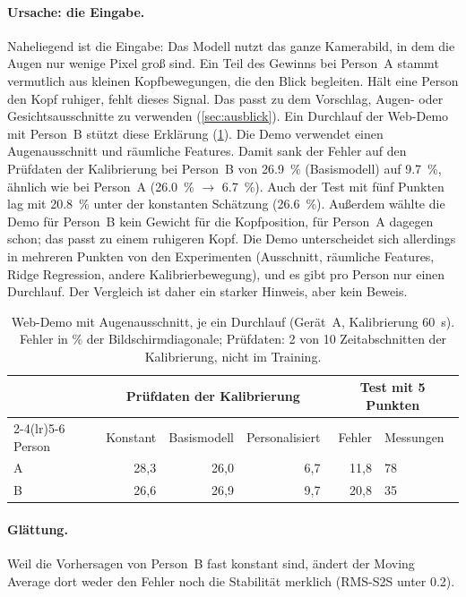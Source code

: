\paragraph{Ursache: die Eingabe.} Naheliegend ist die Eingabe: Das Modell nutzt
das ganze Kamerabild, in dem die Augen nur wenige Pixel groß sind. Ein Teil des
Gewinns bei Person~A stammt vermutlich aus kleinen Kopfbewegungen, die den Blick
begleiten. Hält eine Person den Kopf ruhiger, fehlt dieses Signal. Das passt zu
dem Vorschlag, Augen- oder Gesichtsausschnitte zu verwenden
(\cref{sec:ausblick}). Ein Durchlauf der Web-Demo mit Person~B stützt diese
Erklärung (\cref{tab:demo_persons}). Die Demo verwendet einen Augenausschnitt
und räumliche Features. Damit sank der Fehler auf den Prüfdaten der
Kalibrierung bei Person~B von \SI{26,9}{\percent} (Basismodell) auf
\SI{9,7}{\percent}, ähnlich wie bei Person~A (\SI{26,0}{\percent}
$\rightarrow$ \SI{6,7}{\percent}). Auch der Test mit fünf Punkten lag mit
\SI{20,8}{\percent} unter der konstanten Schätzung (\SI{26,6}{\percent}).
Außerdem wählte die Demo für Person~B kein Gewicht für die Kopfposition, für
Person~A dagegen schon; das passt zu einem ruhigeren Kopf. Die Demo unterscheidet
sich allerdings in mehreren Punkten von den Experimenten (Ausschnitt,
räumliche Features, Ridge Regression, andere Kalibrierbewegung), und es gibt
pro Person nur einen Durchlauf. Der Vergleich ist daher ein starker Hinweis,
aber kein Beweis.

\begin{table}[htbp]
  \centering
  \caption[Web-Demo mit beiden Personen]{Web-Demo mit Augenausschnitt, je ein Durchlauf (Gerät~A,
           Kalibrierung \SI{60}{\second}). Fehler in \si{\percent} der
           Bildschirmdiagonale; Prüfdaten: 2 von 10 Zeitabschnitten der
           Kalibrierung, nicht im Training.}
  \label{tab:demo_persons}
  \small
  \begin{tabular}{l rrr rl}
    \toprule
    & \multicolumn{3}{c}{Prüfdaten der Kalibrierung} & \multicolumn{2}{c}{Test mit 5 Punkten} \\
    \cmidrule(lr){2-4}\cmidrule(lr){5-6}
    Person & Konstant & Basismodell & Personalisiert & Fehler & Messungen \\
    \midrule
    A & 28,3 & 26,0 & 6,7 & 11,8 & 78 \\
    B & 26,6 & 26,9 & 9,7 & 20,8 & 35 \\
    \bottomrule
  \end{tabular}
\end{table}

\paragraph{Glättung.} Weil die Vorhersagen von Person~B fast konstant sind,
ändert der Moving Average dort weder den Fehler noch die Stabilität merklich
(RMS-S2S unter \num{0,2}).

